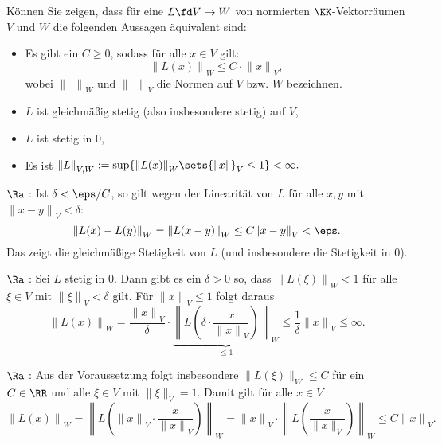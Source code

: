 \begin{frage}\label{09_op}
  Können Sie zeigen, dass für eine  
  $L \fd V \to W$ von normierten $\KK$-Vektorräumen $V$ und $W$ die 
  folgenden Aussagen äquivalent sind:
  {\setlength{\labelsep}{4mm}
    \begin{itemize}
    \item[\desc{a}] Es gibt ein $C\ge 0$, sodass für alle 
      $x\in V$ gilt: 
      \[
      {\| L(x) \|}_W \le C\cdot {\| x \| }_V,
      \]
      wobei ${\|\;\,\|}_W$ und ${\| \;\, \|}_V$ die Normen 
      auf $V$ bzw. $W$ bezeichnen. 
    \item[\desc{b}] $L$ ist gleichmäßig stetig (also insbesondere 
      stetig) auf $V$, \\[-3mm]
    \item[\desc{c}] $L$ ist stetig in $0$, \\[-3mm]
    \item[\desc{d}] Es ist $
      { \| L \| }_{V,W} := \sup\{ {\| L(x) \|}_W \sets {\| x \|}_V \le 1 \} 
      < \infty.$
    \end{itemize}}
\end{frage}

\begin{antwort}
   $\Ra$ : Ist $\delta<\eps/C$, so gilt wegen der 
  Linearität von $L$ für alle $x,y$ mit ${\| x-y \|}_V < \delta$: 
  \[
  {\| L(x)-L(y) \|}_W = {\| L( x-y ) \|}_W 
  \le C {\| x-y \|}_V < \eps.
  \]
  Das zeigt die gleichmäßige Stetigkeit von $L$ (und insbesondere 
  die Stetigkeit in $0$). 

  \medskip
  \noindent
   $\Ra$ : Sei $L$ stetig in $0$. Dann gibt es 
  ein $\delta>0$ so, dass ${\| L(\xi) \|}_W < 1 $ für alle 
  $\xi\in V$ mit 
  ${ \| \xi \| }_V < \delta$ gilt. Für ${ \| x \| }_V \le 1$ folgt 
  daraus 
  \[
  {\| L(x) \|}_W  =   
  \frac{ {\| x \|}_V }{\delta} \cdot 
  \underbrace{
    {\left\| L \left( \delta \cdot \frac{x}{ {\| x \|}_V } \right) \right\|}_W 
  }_{ \le 1 } \le \frac{1}{\delta} {\| x \|}_V \le \infty.
  \]
  
  \medskip
  \noindent
   $\Ra$ : Aus der Voraussetzung  folgt 
  insbesondere ${\|} L( \xi ) {\|}_W \le C$ für ein $C\in \RR$ und 
  alle $\xi \in V$ mit ${\|} \xi {\|}_V = 1$. Damit gilt 
  für alle $x\in V$
  \[
  {\| L(x) \|}_W = 
  { \left\| L\left( 
        {\| x \|}_V \cdot \frac{x}{ {\| x \|}_V } \right) \right \|}_W = 
  {\| x \|}_V \cdot {\left\| L 
      \left( \frac{x}{ {\|} x {\|}_V } \right) \right\|}_W  \le 
  C {\| x \|}_V.
  \]
\end{antwort}

